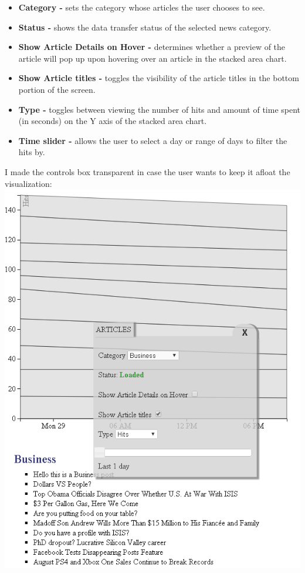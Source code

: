 \documentclass[12pt]{article}
\begin{document}
{\begin{itemize}
\item \textbf{Category - } sets the category whose articles the user chooses to see.
\item \textbf{Status - } shows the data transfer status of the selected news category.
\item \textbf{Show Article Details on Hover - } determines whether a preview of the article will pop up upon hovering over an article in the stacked area chart. 
\item \textbf{Show Article titles - } toggles the visibility of the article titles in the bottom portion of the screen.
\item \textbf{Type - } toggles between viewing the number of hits and amount of time spent (in seconds) on the Y axis of the stacked area chart.
\item \textbf{Time slider - } allows the user to select a day or range of days to filter the hits by.
\end{itemize}

\newpage

\noindent I made the controls box transparent in case the user wants to keep it afloat the visualization: \\

\noindent\includegraphics[scale=0.8]{img/viz_6}



}
\end{document}
